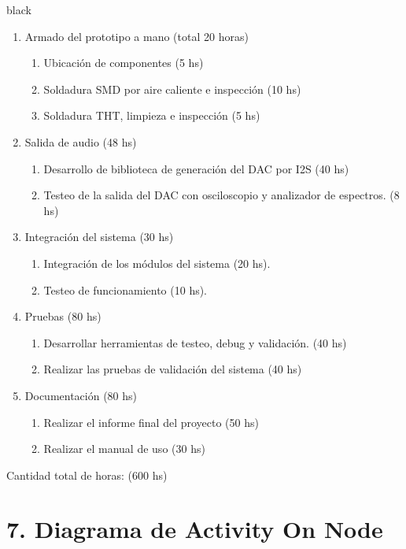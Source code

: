 \documentclass[11pt]{charter}
\begin{document}
\begin{consigna}{black}
\begin{enumerate}
\item  Armado del prototipo a mano (total 20 horas)
\begin{enumerate}
	\item Ubicación de componentes (5 hs)
	\item Soldadura SMD por aire caliente e inspección (10 hs)
	\item Soldadura THT, limpieza e inspección (5 hs)
\end{enumerate}
\item Salida de audio (48 hs)
	\begin{enumerate}
	\item Desarrollo de biblioteca de generación del DAC por I2S (40 hs)
	\item Testeo de la salida del DAC con osciloscopio y analizador de espectros. (8 hs)
	\end{enumerate}
\item Integración del sistema (30 hs)
	\begin{enumerate}
	\item Integración de los módulos del sistema (20 hs).
	\item Testeo de funcionamiento (10 hs).
	\end{enumerate}
\item Pruebas (80 hs)
	\begin{enumerate}
	\item Desarrollar herramientas de testeo, debug y validación. (40 hs)
	\item Realizar las pruebas de validación del sistema (40 hs)
	\end{enumerate}
\item Documentación (80 hs)
	\begin{enumerate}
	\item Realizar el informe final del proyecto (50 hs)
	\item Realizar el manual de uso (30 hs)
	\end{enumerate}
\end{enumerate}

Cantidad total de horas: (600 hs)

\end{consigna}

\section{7. Diagrama de Activity On Node}
\label{sec:AoN}
\end{document}
